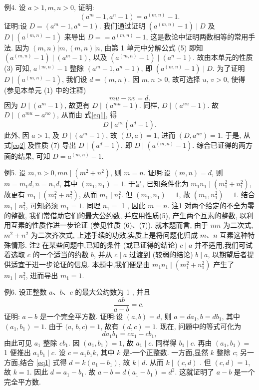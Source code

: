 例4. 设 $a>1, m, n>0$, 证明:
$$
\left(a^m-1, a^n-1\right)=a^{(m, n)}-1 .
$$
证明:设 $D=\left(a^m-1, a^n-1\right)$. 我们通过证明 $\left(a^{(m, n)}-1\right) \mid D$ 及 $D \mid \left(a^{(m, n)}-1\right)$ 来导出 $D==a^{(m, n)}-1$, 这是数论中证明两数相等的常用手法.
因为 $(m, n)|m,(m, n)| n$, 由第 1 单元中分解公式 (5) 即知 $\left(a^{(m, n)}-1\right) \mid \left(a^m-1\right)$, 以及 $\left(a^{(m, n)}-1\right) \mid\left(a^n-1\right)$. 故由本单元的性质 (3) 可知, $a^{(m, n)}-1$ 整除 $\left(a^m-1, a^n-1\right)$, 即 $\left(a^{(m, n)}-1\right) \mid D$.
为了证明 $D \mid\left(a^{(m, n)}-1\right)$, 我们设 $d=(m, n)$. 因 $m, n>0$, 故可选择 $u$, $v>0$, 使得 (参见本单元 (1) 中的注释)
$$
m u-n v=d . \label{eq1}
$$
因为 $D \mid\left(a^m-1\right)$, 故更有 $D \mid\left(a^{m u}-1\right)$. 同样, $D \mid\left(a^{n u}-1\right)$. 故 $D \mid\left(a^{m u}-\right. \left.a^{n o}\right)$, 从而由 式\ref{eq1}, 得
$$
D \mid a^{n v}\left(a^d-1\right) . \label{eq2}
$$
此外, 因 $a>1$, 及 $D \mid\left(a^m-1\right)$, 故 $(D, a)=1$, 进而 $\left(D, a^{n v}\right)=1$. 于是, 从 式\ref{eq2} 及性质 (7) 导出 $D \mid\left(a^d-1\right)$, 即 $D \mid\left(a^{(m, n)}-1\right)$.
综合已证得的两方面的结果, 可知 $D=a^{(m, n)}-1$.



例5. 设 $m, n>0, m n \mid\left(m^2+n^2\right)$, 则 $m=n$.
证明:设 $(m, n)=d$, 则 $m=m_1 d, n=n_1 d$, 其中 $\left(m_1, n_1\right)=1$.
于是, 已知条件化为 $m_1 n_1 \mid\left(m_1^2+n_1^2\right)$, 故更有 $m_1 \mid\left(m_1^2+n_1^2\right)$, 从而 $m_1 \mid n_1^2$.
但 $\left(m_1, n_1\right)=1$, 故 $\left(m_1, n_1^2\right)=1$. 结合 $m_1 \mid n_1^2$, 可知必须 $m_1=1$. 同理 $n_1=$ 1 , 因此 $m=n$.
注1 对两个给定的不全为零的整数, 我们常借助它们的最大公约数, 并应用性质(5), 产生两个互素的整数, 以利用互素的性质作进一步论证 (参见性质 (6)、(7)). 就本题而言, 由于 $m n$ 为二次式, $m^2+n^2$ 为二次齐次式, 上述手续的功效,实质上是将问题化归成 $m 、 n$ 互素这种特殊情形.
注2 在某些问题中,已知的条件 (或已证得的结论) $c \mid a$ 并不适用,我们可试着选取 $c$ 的一个适当的约数 $b$, 并从 $c \mid a$ 过渡到 (较弱的结论) $b \mid a$, 以期望后者提供适宜于进一步论证的信息.
本题中,我们便是由 $m_1 n_1 \mid\left(m_1^2+n_1^2\right)$ 产生了 $m_1 \mid n_1^2$, 进而导出 $m_1=1$.



例6. 设正整数 $a 、 b 、 c$ 的最大公约数为 1 , 并且
$$
\frac{a b}{a-b}=c \text {. }
$$
证明: $a-b$ 是一个完全平方数.
证明:设 $(a, b)=d$, 则 $a=d a_1, b=d b_1$, 其中 $\left(a_1, b_1\right)=1$. 由于 $(a$, $b, c)=1$, 故有 $(d, c)=1$.
现在, 问题中的等式可化为
$$
d a_1 b_1=c a_1-c b_1, \label{eq1}
$$
由此可见 $a_1$ 整除 $c b_1$. 因 $\left(a_1, b_1\right)=1$, 故 $a_1 \mid c$. 同样得 $b_1 \mid c$. 再由 $\left(a_1, b_1\right)=$ 1 便推出 $a_1 b_1 \mid c$.
设 $c=a_1 b_1 k$, 其中 $k$ 是-一个正整数.
一方面,显然 $k$ 整除 $c$; 另一方面,结合 \ref{eq1} 式得 $d=k\left(a_1-b_1\right)$, 故 $k \mid d$. 从而 $k \mid(c, d)$ . 但 $(c, d)=1$, 故 $k=1$.
因此 $d=a_1-b_1$. 故 $a-b=d\left(a_1-b_1\right)=d^2$. 这就证明了 $a-b$ 是一个完全平方数.



